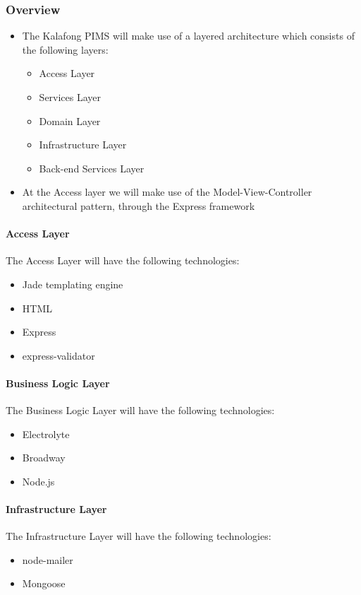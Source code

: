 \subsubsection{Overview}
\begin{itemize}
	\item The Kalafong PIMS will make use of a layered architecture which consists of the following layers: 
		\begin{itemize}
			\item Access Layer 
			\item Services Layer
			\item Domain Layer
			\item Infrastructure Layer				
			\item Back-end Services Layer
		\end{itemize}
	\item At the Access layer we will make use of the Model-View-Controller architectural pattern, through the Express framework
\end{itemize}

\paragraph{Access Layer}\newline
The Access Layer will have the following technologies:
\begin{itemize}
	\item Jade templating engine
	\item HTML
	\item Express
	\item express-validator				
\end{itemize}

\paragraph{Business Logic Layer}\newline
The Business Logic Layer will have the following technologies:
\begin{itemize}
	\item Electrolyte
	\item Broadway
	\item Node.js 
\end{itemize}

\paragraph{Infrastructure Layer}\newline
The Infrastructure Layer will have the following technologies:
\begin{itemize}
	\item node-mailer
	\item Mongoose
\end{itemize}

